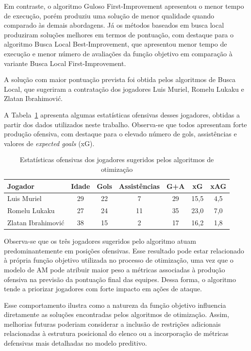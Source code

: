 Em contraste, o algoritmo Guloso First-Improvement apresentou o menor 
tempo de execução, porém produziu uma solução de menor qualidade quando comparado 
às demais abordagens. 
Já os métodos baseados em busca local produziram soluções melhores
em termos de pontuação, com destaque para o algoritmo Busca Local Best-Improvement, 
que apresentou menor tempo de execução e menor número de avaliações da função objetivo 
em comparação à variante Busca Local First-Improvement.

A solução com maior pontuação prevista foi obtida pelos algoritmos de Busca Local, que sugeriram a contratação dos jogadores Luis Muriel, Romelu Lukaku 
e Zlatan Ibrahimović.

A Tabela~\ref{tab:jogadores_sugeridos} apresenta algumas estatísticas ofensivas desses jogadores, obtidas a partir dos dados utilizados neste trabalho. 
Observa-se que todos apresentam forte produção ofensiva, com destaque para o elevado número de gols, assistências e valores de \textit{expected goals} (xG).

\begin{table}[H]
\centering
\caption{Estatísticas ofensivas dos jogadores sugeridos pelos algoritmos de otimização}
\label{tab:jogadores_sugeridos}
\begin{tabular}{lcccccc}
\toprule
Jogador & Idade & Gols & Assistências & G+A & xG & xAG \\
\midrule
Luis Muriel & 29 & 22 & 7 & 29 & 15,5 & 4,5 \\
Romelu Lukaku & 27 & 24 & 11 & 35 & 23,0 & 7,0 \\
Zlatan Ibrahimović & 38 & 15 & 2 & 17 & 16,2 & 1,8 \\
\bottomrule
\end{tabular}
\end{table}

Observa-se que os três jogadores sugeridos pelo algoritmo atuam predominantemente 
em posições ofensivas. Esse resultado pode estar relacionado à própria função 
objetivo utilizada no processo de otimização, uma vez que o modelo de AM pode 
atribuir maior peso a métricas associadas à produção ofensiva na previsão da pontuação 
final das equipes. Dessa forma, o algoritmo tende a priorizar jogadores com forte 
impacto em ações de ataque.

Esse comportamento ilustra como a natureza da função objetivo influencia 
diretamente as soluções encontradas pelos algoritmos de otimização. Assim, melhorias futuras 
poderiam considerar a inclusão de restrições adicionais relacionadas à estrutura 
posicional do elenco ou a incorporação de métricas defensivas mais detalhadas 
no modelo preditivo.

